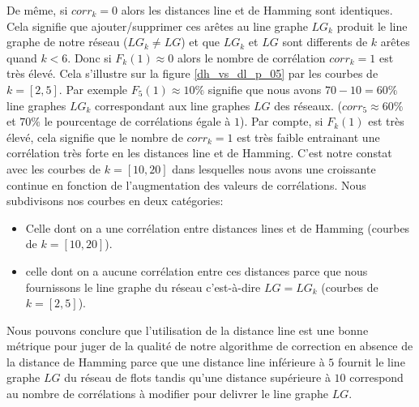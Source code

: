 De m\^eme, si $corr_k = 0$ alors les distances line et de Hamming sont identiques. Cela signifie que ajouter/supprimer ces ar\^etes au line graphe $LG_k$ produit le line graphe de notre r\'eseau ($LG_{k} \neq LG$) et que $LG_{k}$ et $LG$ sont differents de $k$ ar\^etes quand $k < 6$.
\newline
Donc si $F_k(1) \approx 0$ alors le nombre de corr\'elation $corr_k = 1$ est tr\`es \'elev\'e. Cela s'illustre sur la figure \ref{dh_vs_dl_p_05} par les courbes de $k=[2,5]$. 
Par exemple $F_5(1) \approx 10\%$ signifie que nous avons $70-10=60\%$ line graphes $LG_k$ correspondant aux line graphes $LG$ des r\'eseaux. ($corr_5 \approx 60\%$ et $70\%$ le pourcentage de corr\'elations \'egale \`a $1$).
\newline
Par compte, si  $F_k(1)$ est tr\`es \'elev\'e, cela signifie que le nombre de $corr_k = 1$ est tr\`es faible entrainant une corr\'elation tr\`es forte en les distances line et de Hamming.
C'est notre constat avec les courbes de $k = [10,20]$ dans lesquelles nous avons une  croissante continue en fonction de l'augmentation des valeurs de corr\'elations.
\newline
Nous subdivisons nos courbes en deux cat\'egories:
\begin{itemize}
	\item Celle dont on a une corr\'elation entre distances lines et de Hamming (courbes de $k = [10,20]$).
	\item celle dont on a aucune corr\'elation entre ces distances parce que nous fournissons le line graphe du r\'eseau c'est-\`a-dire  $LG = LG_k$ (courbes de $k = [2,5]$). 
\end{itemize}
Nous pouvons conclure que l'utilisation de la distance line est une bonne m\'etrique pour juger de la qualit\'e de notre algorithme de correction en absence de la distance de Hamming parce que une distance line inf\'erieure \`a $5$ fournit le line graphe $LG$ du r\'eseau de flots tandis qu'une distance sup\'erieure \`a $10$ correspond au nombre de corr\'elations \`a modifier pour delivrer le line graphe $LG$. 